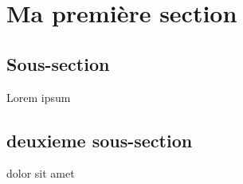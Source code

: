 \section{Ma première section}

\subsection{Sous-section}
Lorem ipsum

\subsection{deuxieme sous-section}

dolor sit amet